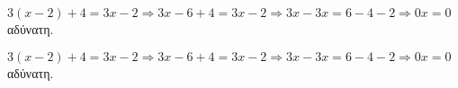 \begin{rlist}
\item $3(x-2)+4=3x-2\Rightarrow 3x-6+4=3x-2\Rightarrow 3x-3x=6-4-2\Rightarrow 0x=0$ αδύνατη.
\end{rlist}
\begin{rlist}
\item $3(x-2)+4=3x-2\Rightarrow 3x-6+4=3x-2\Rightarrow 3x-3x=6-4-2\Rightarrow 0x=0$ αδύνατη.
\end{rlist}

